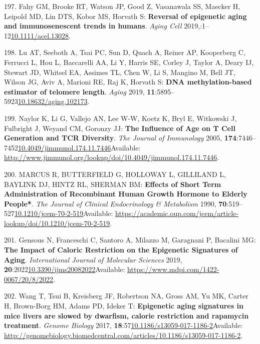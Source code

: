 \documentclass[
]{book}
\begin{document}
\leavevmode\hypertarget{ref-Fahy2019}{}%
197. Fahy GM, Brooke RT, Watson JP, Good Z, Vasanawala SS, Maecker H, Leipold MD, Lin DTS, Kobor MS, Horvath S: \textbf{Reversal of epigenetic aging and immunosenescent trends in humans}. \emph{Aging Cell} 2019,:1--12\href{https://doi.org/10.1111/acel.13028}{10.1111/acel.13028}.

\leavevmode\hypertarget{ref-Lu2019a}{}%
198. Lu AT, Seeboth A, Tsai PC, Sun D, Quach A, Reiner AP, Kooperberg C, Ferrucci L, Hou L, Baccarelli AA, Li Y, Harris SE, Corley J, Taylor A, Deary IJ, Stewart JD, Whitsel EA, Assimes TL, Chen W, Li S, Mangino M, Bell JT, Wilson JG, Aviv A, Marioni RE, Raj K, Horvath S: \textbf{DNA methylation-based estimator of telomere length}. \emph{Aging} 2019, \textbf{11}:5895--5923\href{https://doi.org/10.18632/aging.102173}{10.18632/aging.102173}.

\leavevmode\hypertarget{ref-Naylor2005}{}%
199. Naylor K, Li G, Vallejo AN, Lee W-W, Koetz K, Bryl E, Witkowski J, Fulbright J, Weyand CM, Goronzy JJ: \textbf{The Influence of Age on T Cell Generation and TCR Diversity}. \emph{The Journal of Immunology} 2005, \textbf{174}:7446--7452\href{https://doi.org/10.4049/jimmunol.174.11.7446}{10.4049/jimmunol.174.11.7446}Available: \url{http://www.jimmunol.org/lookup/doi/10.4049/jimmunol.174.11.7446}.

\leavevmode\hypertarget{ref-Marcus1990}{}%
200. MARCUS R, BUTTERFIELD G, HOLLOWAY L, GILLILAND L, BAYLINK DJ, HINTZ RL, SHERMAN BM: \textbf{Effects of Short Term Administration of Recombinant Human Growth Hormone to Elderly People*}. \emph{The Journal of Clinical Endocrinology \& Metabolism} 1990, \textbf{70}:519--527\href{https://doi.org/10.1210/jcem-70-2-519}{10.1210/jcem-70-2-519}Available: \url{https://academic.oup.com/jcem/article-lookup/doi/10.1210/jcem-70-2-519}.

\leavevmode\hypertarget{ref-Gensous2019}{}%
201. Gensous N, Franceschi C, Santoro A, Milazzo M, Garagnani P, Bacalini MG: \textbf{The Impact of Caloric Restriction on the Epigenetic Signatures of Aging}. \emph{International Journal of Molecular Sciences} 2019, \textbf{20}:2022\href{https://doi.org/10.3390/ijms20082022}{10.3390/ijms20082022}Available: \url{https://www.mdpi.com/1422-0067/20/8/2022}.

\leavevmode\hypertarget{ref-Wang2017a}{}%
202. Wang T, Tsui B, Kreisberg JF, Robertson NA, Gross AM, Yu MK, Carter H, Brown-Borg HM, Adams PD, Ideker T: \textbf{Epigenetic aging signatures in mice livers are slowed by dwarfism, calorie restriction and rapamycin treatment}. \emph{Genome Biology} 2017, \textbf{18}:57\href{https://doi.org/10.1186/s13059-017-1186-2}{10.1186/s13059-017-1186-2}Available: \url{http://genomebiology.biomedcentral.com/articles/10.1186/s13059-017-1186-2}.
\end{document}
